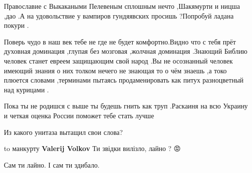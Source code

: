 \begin{itemize}
\begin{itemize}
\end{itemize}

 

Православие с Выкакаными Пелевеным сплошным нечто ,Шакямурти и ницша ,дао .А на
удовольствие у вампиров гундяявских просишь ?Попробуй ладана покури .

Поверь чудо в наш век тебе не где не будет комфортно.Видно что с тебя прёт
духовная доминация ,глупая без мозговая ,жолчная доминация .Знающий Библию
человек станет евреем защищающим свой народ .Вы не осознанный человек имеющий
знания о них толком нечего не знающая то о чём знаешь ,а токо плюется словами
,терминами пытаясь продаменировать как питух разноцветный над курицами .

Пока ты не родишся с выше ты будешь гнить как труп .Раскаиня на всю Украину и
четкая оценка России поможет тебе стать лучше

\begin{itemize}
 
Из какого унитаза вытащил свои слова?

 
to манкурту \textbf{Valerij Volkov}
Ти звідки вилізло, лайно ?
😡🤣

 
Сам ти лайно.
І сам ти здибало.
\end{itemize}

 


\end{itemize}
